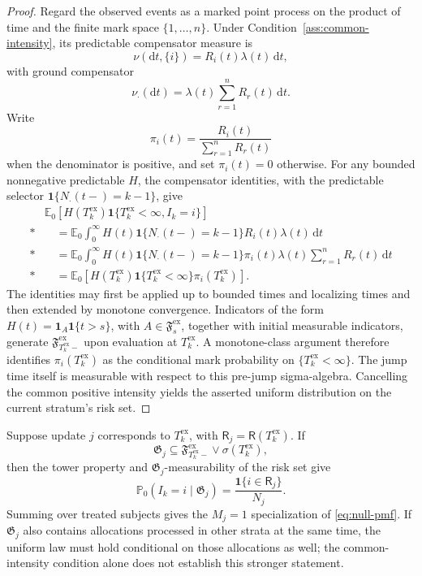 \documentclass[12pt]{article}
\theoremstyle{definition}
\theoremstyle{remark}
\begin{document}
\begin{proof}
Regard the observed events as a marked point process on the product of time and the finite mark space $\{1,\ldots,n\}$. Under Condition~\ref{ass:common-intensity}, its predictable compensator measure is
\[
 \nu(\mathrm dt,\{i\})=R_i(t)\lambda(t)\,\mathrm dt,
\]
with ground compensator
\[
 \nu_\cdot(\mathrm dt)=\lambda(t)\sum_{r=1}^nR_r(t)\,\mathrm dt.
\]
Write
\[
 \pi_i(t)=\frac{R_i(t)}{\sum_{r=1}^nR_r(t)}
\]
when the denominator is positive, and set $\pi_i(t)=0$ otherwise. For any bounded nonnegative predictable $H$, the compensator identities, with the predictable selector $\mathbf 1\{N_\cdot(t-)=k-1\}$, give
\begin{align*}
 &\mathbb E_0\left[H(T_k^{\mathrm{ex}})\mathbf 1\{T_k^{\mathrm{ex}}<\infty,I_k=i\}\right]\\*
 &\quad=\mathbb E_0\int_0^\infty
 H(t)\mathbf 1\{N_\cdot(t-)=k-1\}R_i(t)\lambda(t)\,\mathrm dt\\*
 &\quad=\mathbb E_0\int_0^\infty
 H(t)\mathbf 1\{N_\cdot(t-)=k-1\}\pi_i(t)
 \lambda(t)\sum_{r=1}^nR_r(t)\,\mathrm dt\\*
 &\quad=\mathbb E_0\left[H(T_k^{\mathrm{ex}})\mathbf 1\{T_k^{\mathrm{ex}}<\infty\}
 \pi_i(T_k^{\mathrm{ex}})\right].
\end{align*}
The identities may first be applied up to bounded times and localizing times and then extended by monotone convergence. Indicators of the form $H(t)=\mathbf 1_A\mathbf 1\{t>s\}$, with $A\in\mathfrak F_s^{\mathrm{ex}}$, together with initial measurable indicators, generate $\mathfrak F_{T_k^{\mathrm{ex}}-}^{\mathrm{ex}}$ upon evaluation at $T_k^{\mathrm{ex}}$. A monotone-class argument therefore identifies $\pi_i(T_k^{\mathrm{ex}})$ as the conditional mark probability on $\{T_k^{\mathrm{ex}}<\infty\}$. The jump time itself is measurable with respect to this pre-jump sigma-algebra. Cancelling the common positive intensity yields the asserted uniform distribution on the current stratum's risk set.
\end{proof}

Suppose update $j$ corresponds to $T_k^{\mathrm{ex}}$, with $\mathsf R_j=\mathsf R(T_k^{\mathrm{ex}})$. If
\[
 \mathfrak G_j\subseteq
 \mathfrak F_{T_k^{\mathrm{ex}}-}^{\mathrm{ex}}\vee\sigma(T_k^{\mathrm{ex}}),
\]
then the tower property and $\mathfrak G_j$-measurability of the risk set give
\[
 \mathbb P_0(I_k=i\mid\mathfrak G_j)
 =\frac{\mathbf 1\{i\in\mathsf R_j\}}{N_j}.
\]
Summing over treated subjects gives the $M_j=1$ specialization of \eqref{eq:null-pmf}. If $\mathfrak G_j$ also contains allocations processed in other strata at the same time, the uniform law must hold conditional on those allocations as well; the common-intensity condition alone does not establish this stronger statement.
\end{document}
